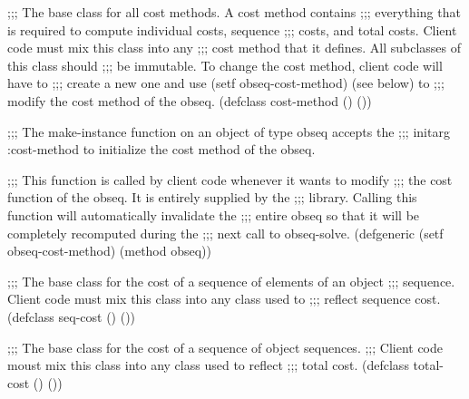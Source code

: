 ;;; The base class for all cost methods.  A cost method contains
;;; everything that is required to compute individual costs, sequence
;;; costs, and total costs. Client code must mix this class into any
;;; cost method that it defines.  All subclasses of this class should
;;; be immutable.  To change the cost method, client code will have to
;;; create a new one and use (setf obseq-cost-method) (see below) to
;;; modify the cost method of the obseq.
(defclass cost-method () ())

;;; The make-instance function on an object of type obseq accepts the
;;; initarg :cost-method to initialize the cost method of the obseq.

;;; This function is called by client code whenever it wants to modify
;;; the cost function of the obseq.  It is entirely supplied by the
;;; library.  Calling this function will automatically invalidate the
;;; entire obseq so that it will be completely recomputed during the
;;; next call to obseq-solve.
(defgeneric (setf obseq-cost-method) (method obseq))

;;; The base class for the cost of a sequence of elements of an object
;;; sequence. Client code must mix this class into any class used to 
;;; reflect sequence cost.
(defclass seq-cost () ())

;;; The base class for the cost of a sequence of object sequences. 
;;; Client code moust mix this class into any class used to reflect
;;; total cost.
(defclass total-cost () ())

